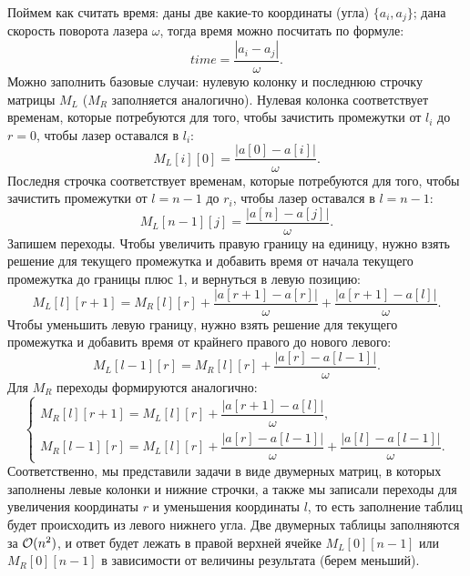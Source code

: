 \begin{enumerate}
\begin{solution}
    Поймем как считать время: даны две какие-то координаты (угла) $\{a_i, a_j\}$; дана скорость поворота лазера $\omega$, тогда время можно посчитать по формуле:
    \begin{equation}
      time = \dfrac{|a_i-a_j|}{\omega}.
    \end{equation}
    Можно заполнить базовые случаи: нулевую колонку и последнюю строчку матрицы $M_L$ ($M_R$ заполняется аналогично). Нулевая колонка соответствует временам, которые потребуются для того, чтобы зачистить промежутки от $l_i$ до $r=0$, чтобы лазер оставался в $l_i$:
    \begin{equation}
      M_L[i][0] = \dfrac{|a[0]-a[i]|}{\omega}.
    \end{equation}
    Последня строчка соответствует временам, которые потребуются для того, чтобы зачистить промежутки от $l=n-1$ до $r_i$, чтобы лазер оставался в $l=n-1$:
    \begin{equation}
      M_L[n-1][j] = \dfrac{|a[n]-a[j]|}{\omega}.
    \end{equation}
    Запишем переходы. Чтобы увеличить правую границу на единицу, нужно взять решение для текущего промежутка и добавить время от начала текущего промежутка до границы плюс 1, и вернуться в левую позицию:
    \begin{equation}
      M_L[l][r+1] = M_R[l][r] + \dfrac{|a[r+1] - a[r]|}{\omega} + \dfrac{|a[r+1] - a[l]|}{\omega}.
    \end{equation}
    Чтобы уменьшить левую границу, нужно взять решение для текущего промежутка и добавить время от крайнего правого до нового левого:
    \begin{equation}
      M_L[l-1][r] = M_R[l][r] + \dfrac{|a[r]-a[l-1]|}{\omega}.
    \end{equation}
    Для $M_R$ переходы формируются аналогично:
    \begin{equation}
      \begin{cases}
        M_R[l][r+1] = M_L[l][r] + \dfrac{|a[r+1] - a[l]|}{\omega}, \\
        M_R[l-1][r] = M_L[l][r] + \dfrac{|a[r]-a[l-1]|}{\omega} + \dfrac{|a[l]-a[l-1]|}{\omega}.
      \end{cases}
    \end{equation}
    Соответственно, мы представили задачи в виде двумерных матриц, в которых заполнены левые колонки и нижние строчки, а также мы записали переходы для увеличения координаты $r$ и уменьшения координаты $l$, то есть заполнение таблиц будет происходить из левого нижнего угла. Две двумерных таблицы заполняются за $\mathcal{O}(n^2)$, и ответ будет лежать в правой верхней ячейке $M_L[0][n-1]$ или $M_R[0][n-1]$ в зависимости от величины результата (берем меньший).
    

\end{solution}
\end{enumerate}
